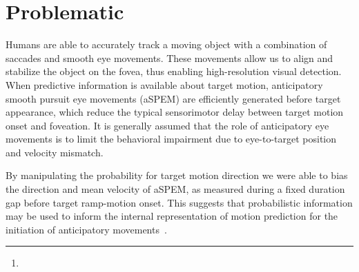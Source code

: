 \documentclass[profile,final,english, draft]{article}%
\title{\Title}%
\author{\AuthorA, \AuthorB,  \AuthorC,  \AuthorD\thanks{\Address} }
\begin{document}
%
\maketitle%
\begin{abstract}
\Abstract
\end{abstract}

\section*{Problematic}

Humans are able to accurately track a moving object with a combination of saccades and smooth eye movements. These movements allow us to align and stabilize the object on the fovea, thus enabling high-resolution visual detection. When predictive information is available about target motion, anticipatory smooth pursuit eye movements (aSPEM) are efficiently generated before target appearance, which reduce the typical sensorimotor delay between target motion onset and foveation. It is generally assumed that the role of anticipatory eye movements is to limit the behavioral impairment due to eye-to-target position and velocity mismatch.

By manipulating the probability for target motion direction we were able to bias the direction and mean velocity of aSPEM, as measured during a fixed duration gap before target ramp-motion onset. This suggests that probabilistic information may be used to inform the internal representation of motion prediction for the initiation of anticipatory movements~\parencite{Montagnini2010}.

\end{document}
